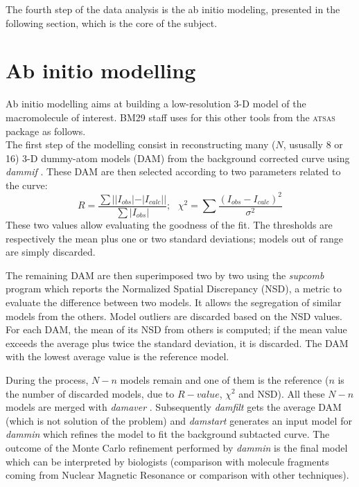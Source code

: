 \documentclass[a4paper, 11pt]{report}
\begin{document}
The fourth step of the data analysis is the ab initio modeling, 
presented in the following section, which is the core of the subject.

\section{Ab initio modelling}
\label{modelling}                           %

Ab initio modelling aims at building a low-resolution 3-D model of the 
macromolecule of interest. 
BM29 staff uses for this other tools from the \textsc{atsas} package 
as follows.\\

The first step of the modelling consist in reconstructing many ($N$, ususally 8
or 16) 3-D dummy-atom models (DAM) from the background corrected curve using 
\textit{dammif} \cite{dammif}. 
These DAM are then selected according to two parameters related to the 
curve: 
\[
R = \frac {\sum {||I_{obs}| - |I_{calc}||}}{\sum {|I_{obs}|}}; \ \ \ 
\chi^{2} = \sum {\frac {(I_{obs} - I_{calc})^{2}}{\sigma^{2}}}
\]
These two values allow evaluating the goodness of the fit. 
The thresholds are respectively the mean plus one or two standard 
deviations; models out of range are simply discarded.

The remaining DAM are then superimposed two by two using the 
\textit{supcomb} \cite{supcomb} program which reports the Normalized 
Spatial Discrepancy (NSD), a metric to evaluate the difference between 
two models. 
It allows the segregation of similar models from the others. 
Model outliers are discarded based on the NSD
values.
For each DAM, the mean of its NSD from others is computed; if the mean 
value exceeds the average plus twice the standard deviation, it is 
discarded. 
The DAM with the lowest average value is the reference model.

During the process, $N - n$ models remain and one of them is the 
reference ($n$ is the number of discarded models, due to $R-value$, 
$\chi^{2}$ and NSD). 
All these $N - n$ models are merged with \textit{damaver} 
\cite{damaver}. 
Subsequently \textit{damfilt} gets the average DAM (which is not solution of
the problem) and \textit{damstart} generates an input model for 
\textit{dammin} \cite{dammin} which refines the model to fit the 
background subtacted curve. 
The outcome of the Monte Carlo refinement performed by \textit{dammin} 
is the final model which can be interpreted by biologists (comparison 
with molecule fragments coming from Nuclear Magnetic Resonance or 
comparison with other techniques).
\end{document}
